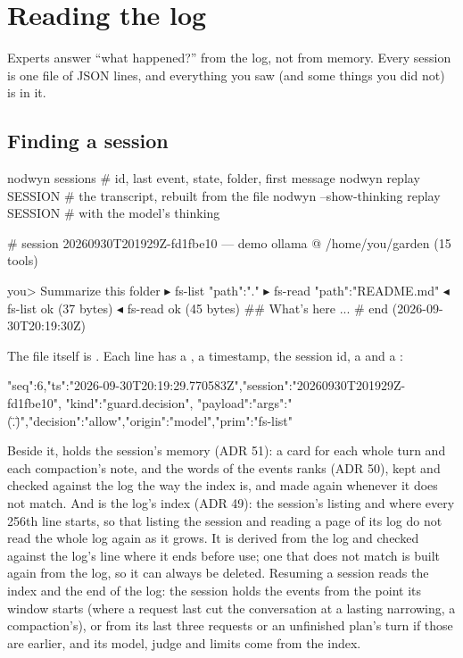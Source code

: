 \chapter{Reading the log}
\label{ch:log}

Experts answer ``what happened?'' from the log, not from memory. Every
session is one file of JSON lines, and everything you saw (and some things
you did not) is in it.

\section{Finding a session}

\begin{sh}
nodwyn sessions                          # id, last event, state, folder, first message
nodwyn replay SESSION                    # the transcript, rebuilt from the file
nodwyn --show-thinking replay SESSION    # with the model's thinking
\end{sh}

\begin{txt}
# session 20260930T201929Z-fd1fbe10 — demo ollama @ /home/you/garden (15 tools)

you> Summarize this folder
▸ fs-list {"path":"."}
▸ fs-read {"path":"README.md"}
◂ fs-list ok (37 bytes)
◂ fs-read ok (45 bytes)
## What's here
...
# end (2026-09-30T20:19:30Z)
\end{txt}

The file itself is
. Each line
has a , a timestamp, the session id, a  and a
:

\begin{txt}
{"seq":6,"ts":"2026-09-30T20:19:29.770583Z","session":"20260930T201929Z-fd1fbe10",
 "kind":"guard.decision",
 "payload":{"args":"(\".\")","decision":"allow","origin":"model","prim":"fs-list"}}
\end{txt}

Beside it,  holds the session's memory (ADR 51): a card
for each whole turn and each compaction's note, and the words of the events
 ranks (ADR 50), kept and checked against the log the way
the index is, and made again whenever it does not match. And
 is the log's index (ADR 49): the session's
listing and where every 256th line starts, so that listing the session and
reading a page of its log do not read the whole log again as it grows. It
is derived from the log and checked against the log's line where it ends
before use; one that does not match is built again from the log, so it can
always be deleted. Resuming a session reads the index and the end of the
log: the session holds the events from the point its window starts (where a
request last cut the conversation at a lasting narrowing, a compaction's),
or from its last three requests or an unfinished plan's turn if those are
earlier, and its model, judge and limits come from the index.


